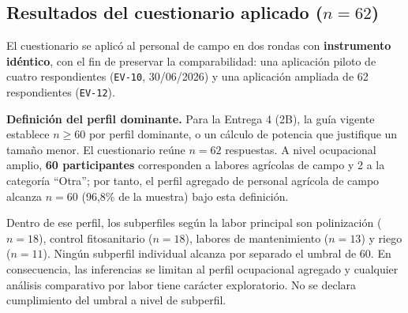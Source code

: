 \documentclass[11pt,a4paper]{article}
\newcommand{\id}[1]{\texttt{\begingroup\hyphenpenalty=10000\relax#1\endgroup}}
\renewcommand{\id}[1]{\texttt{#1}}
\begin{document}
\subsection[Resultados del cuestionario aplicado (n=62)]{Resultados del cuestionario aplicado ($n=62$)}

El cuestionario se aplicó al personal de campo en dos rondas con \textbf{instrumento idéntico}, con
el fin de preservar la comparabilidad: una aplicación piloto de cuatro respondientes
(\id{EV-10}, 30/06/2026) y una aplicación ampliada de 62 respondientes (\id{EV-12}).

\textbf{Definición del perfil dominante.} Para la Entrega 4 (2B), la guía vigente establece
$n \geq 60$ por perfil dominante, o un cálculo de potencia que justifique un tamaño menor.
El cuestionario reúne $n = 62$ respuestas. A nivel ocupacional amplio,
\textbf{60 participantes} corresponden a labores agrícolas de campo y 2 a la categoría
``Otra''; por tanto, el perfil agregado de personal agrícola de campo alcanza
$n = 60$ (96{,}8\% de la muestra) bajo esta definición.

Dentro de ese perfil, los subperfiles según la labor principal son polinización
($n = 18$), control fitosanitario ($n = 18$), labores de mantenimiento
($n = 13$) y riego ($n = 11$). Ningún subperfil individual alcanza por separado
el umbral de 60. En consecuencia, las inferencias se limitan al perfil ocupacional
agregado y cualquier análisis comparativo por labor tiene carácter exploratorio.
No se declara cumplimiento del umbral a nivel de subperfil.
\end{document}
